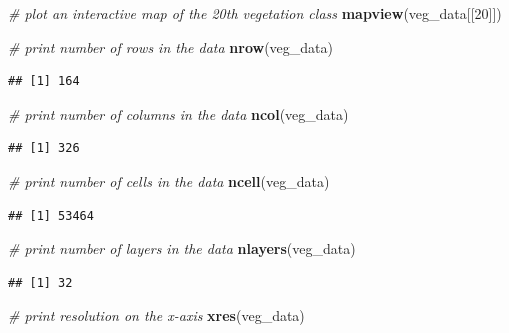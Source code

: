 \documentclass[
  12pt,
]{book}
\newenvironment{Shaded}{\begin{snugshade}}{\end{snugshade}}
\newcommand{\CommentTok}[1]{\textcolor[rgb]{0.56,0.35,0.01}{\textit{#1}}}
\newcommand{\DecValTok}[1]{\textcolor[rgb]{0.00,0.00,0.81}{#1}}
\newcommand{\KeywordTok}[1]{\textcolor[rgb]{0.13,0.29,0.53}{\textbf{#1}}}
\newcommand{\NormalTok}[1]{#1}
\begin{document}
\begin{Shaded}
\begin{Highlighting}[]
\CommentTok{# plot an interactive map of the 20th vegetation class}
\KeywordTok{mapview}\NormalTok{(veg_data[[}\DecValTok{20}\NormalTok{]])}
\end{Highlighting}
\end{Shaded}

\begin{Shaded}
\begin{Highlighting}[]
\CommentTok{# print number of rows in the data}
\KeywordTok{nrow}\NormalTok{(veg_data)}
\end{Highlighting}
\end{Shaded}

\begin{verbatim}
## [1] 164
\end{verbatim}

\begin{Shaded}
\begin{Highlighting}[]
\CommentTok{# print number of columns  in the data}
\KeywordTok{ncol}\NormalTok{(veg_data)}
\end{Highlighting}
\end{Shaded}

\begin{verbatim}
## [1] 326
\end{verbatim}

\begin{Shaded}
\begin{Highlighting}[]
\CommentTok{# print number of cells in the data}
\KeywordTok{ncell}\NormalTok{(veg_data)}
\end{Highlighting}
\end{Shaded}

\begin{verbatim}
## [1] 53464
\end{verbatim}

\begin{Shaded}
\begin{Highlighting}[]
\CommentTok{# print number of layers in the data}
\KeywordTok{nlayers}\NormalTok{(veg_data)}
\end{Highlighting}
\end{Shaded}

\begin{verbatim}
## [1] 32
\end{verbatim}

\begin{Shaded}
\begin{Highlighting}[]
\CommentTok{# print  resolution on the x-axis}
\KeywordTok{xres}\NormalTok{(veg_data)}
\end{Highlighting}
\end{Shaded}
\end{document}
